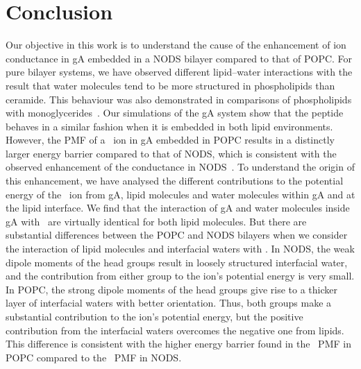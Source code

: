 \section{Conclusion}
Our objective in this work is to understand the cause of the enhancement of ion conductance in
gA embedded in a NODS bilayer compared to that of POPC. For pure bilayer systems, we have observed 
different lipid–water interactions with the result that water molecules tend to be more structured 
in phospholipids than ceramide. This behaviour was also demonstrated in comparisons of phospholipids 
with monoglycerides~\cite{Qin2007}. Our simulations of the gA system show that the peptide behaves 
in a similar fashion when it is embedded in both lipid environments. However, the PMF of a \K\ ion 
in gA embedded in POPC results in a distinctly larger energy barrier compared to that of NODS, which 
is consistent with the observed enhancement of the conductance in NODS~\cite{DeGodoy2011}. To 
understand the origin of this enhancement, we have analysed the different contributions to the 
potential energy of the \K\ ion from gA, lipid molecules and water molecules within gA and at the 
lipid interface. We find that the interaction of gA and water molecules inside gA with \K\ are 
virtually identical for both lipid molecules. But there are substantial differences between the 
POPC and NODS bilayers when we consider the interaction of lipid molecules and interfacial waters 
with \K. In NODS, the weak dipole moments of the head groups result in loosely structured interfacial 
water, and the contribution from either group to the ion's potential energy is very 
small. In POPC, the strong dipole moments of the head groups give rise to a thicker layer of 
interfacial waters with better orientation. Thus, both groups make a substantial contribution to 
the ion's potential energy, but the positive contribution from the interfacial waters overcomes 
the negative one from lipids. This difference is consistent with the higher energy barrier found 
in the \K\ PMF in POPC compared to the \K\ PMF in NODS.
